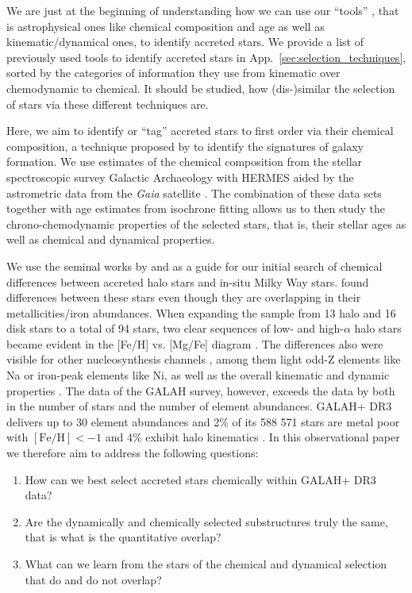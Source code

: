 \documentclass[fleqn,usenatbib]{mnras}
\newcommand{\Gaia}{\textit{Gaia}\xspace} %
\begin{document}
We are just at the beginning of understanding how we can use our ``tools'' \citep{Helmi2020}, that is astrophysical ones like chemical composition and age as well as kinematic/dynamical ones, to identify accreted stars. We provide a list of previously used tools to identify accreted stars in App.~\ref{sec:selection_techniques}, sorted by the categories of information they use from kinematic over chemodynamic to chemical. It should be studied, how (dis-)similar the selection of stars via these different techniques are.

Here, we aim to identify or ``tag'' accreted stars to first order via their chemical composition, a technique proposed by \citet{FreemanBlandHawthorn2002} to identify the signatures of galaxy formation. We use estimates of the chemical composition from the stellar spectroscopic survey Galactic Archaeology with HERMES \citep[GALAH, ][]{DeSilva2015, Buder2021} aided by the astrometric data from the \Gaia satellite \citep{Brown2021}. The combination of these data sets together with age estimates from isochrone fitting allows us to then study the chrono-chemodynamic properties of the selected stars, that is, their stellar ages as well as chemical and dynamical properties.

We use the seminal works by \citet{Nissen1997b, Nissen2010, Nissen2011} and \citet{Nissen2014} as a guide for our initial search of chemical differences between accreted halo stars and in-situ Milky Way stars. \citet{Nissen1997b} found differences between these stars even though they are overlapping in their metallicities/iron abundances. When expanding the sample from 13 halo and 16 disk stars to a total of 94 stars, two clear sequences of low- and high-$\alpha$ halo stars became evident in the [Fe/H] vs. [Mg/Fe] diagram \citep{Nissen2010}. The differences also were visible for other nucleosynthesis channels \citep{Nissen2010, Nissen2011}, among them light odd-Z elements like Na or iron-peak elements like Ni, as well as the overall kinematic and dynamic properties \citep{Nissen2010, Schuster2012}. The data of the GALAH survey, however, exceeds the data by \citet{Nissen2010} both in the number of stars and the number of element abundances. GALAH+ DR3 delivers up to 30 element abundances and 2\% of its 588 571 stars are metal poor with $\mathrm{[Fe/H]} < -1$ and 4\% exhibit halo kinematics \citep{Buder2021}. In this observational paper we therefore aim to address the following questions:
\begin{enumerate}
\item How can we best select accreted stars chemically within GALAH+ DR3 data?
\item Are the dynamically and chemically selected substructures truly the same, that is what is the quantitative overlap?
\item What can we learn from the stars of the chemical and dynamical selection that do and do not overlap?
\end{enumerate}
\end{document}
